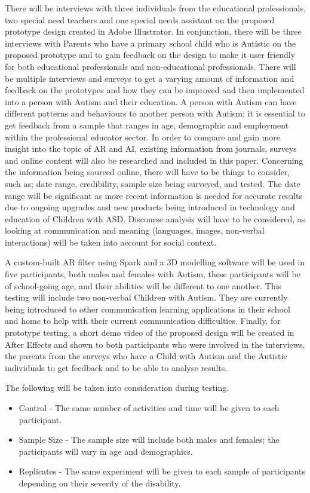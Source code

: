 There will be interviews with three individuals from the educational professionals, two special need teachers and one special needs assistant on the proposed prototype design created in Adobe Illustrator. In conjunction, there will be three interviews with Parents who have a primary school child who is Autistic on the proposed prototype and to gain feedback on the design to make it user friendly for both educational professionals and non-educational professionals. There will be multiple interviews and surveys to get a varying amount of information and feedback on the prototypes and how they can be improved and then implemented into a person with Autism and their education. A person with Autism can have different patterns and behaviours to another person with Autism; it is essential to get feedback from a sample that ranges in age, demographic and employment within the professional educator sector. In order to compare and gain more insight into the topic of AR and AI, existing information from journals, surveys and online content will also be researched and included in this paper. Concerning the information being sourced online, there will have to be things to consider, such as; date range, credibility, sample size being surveyed, and tested. The date range will be significant as more recent information is needed for accurate results due to ongoing upgrades and new products being introduced in technology and education of Children with ASD. Discourse analysis will have to be considered, as looking at communication and meaning (languages, images, non-verbal interactions) will be taken into account for social context.

A custom-built AR filter using Spark and a 3D modelling software will be used in five participants, both males and females with Autism, these participants will be of school-going age, and their abilities will be different to one another. This testing will include two non-verbal Children with Autism. They are currently being introduced to other communication learning applications in their school and home to help with their current communication difficulties. Finally, for prototype testing, a short demo video of the proposed design will be created in After Effects and shown to both participants who were involved in the interviews, the parents from the surveys who have a Child with Autism and the Autistic individuals to get feedback and to be able to analyse results.




The following will be taken into consideration during testing.
\begin{itemize}
    \item Control - The same number of activities and time will be given to each participant. 
    \item Sample Size - The sample size will include both males and females; the participants will vary in age and demographics.
    \item Replicates - The same experiment will be given to each sample of participants depending on their severity of the disability.
\end{itemize}

